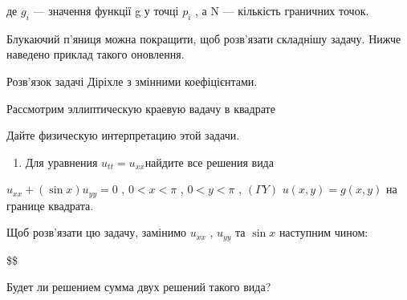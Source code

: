 \documentclass[
  ukrainian,
]{article}
\providecommand{\tightlist}{%
  \setlength{\itemsep}{0pt}\setlength{\parskip}{0pt}}
\begin{document}
де \(g_i\) --- значення функції g у точці \(p_i\) , а N --- кількість
граничних точок.

Блукаючий п'яниця можна покращити, щоб розв'язати складнішу задачу.
Нижче наведено приклад такого оновлення.

Розв'язок задачі Діріхле з змінними коефіцієнтами.

Рассмотрим эллиптическую краевую вадачу в квадрате

Дайте физическую интерпретацию этой задачи.

\begin{enumerate}
\def\labelenumi{\arabic{enumi}.}
\setcounter{enumi}{3}
\tightlist
\item
  Для уравнения \(u_{tt} = u_{xx}\)найдите все решения вида
\end{enumerate}

\(u_{xx} + (\sin x) u_{yy} = 0\) , \(0 < x < \pi\) , \(0 < y < \pi\) ,
\((\Gamma Y)\) \(u(x, y) = g(x, y)\) на границе квадрата.

Щоб розв'язати цю задачу, замінимо \(u_{xx}\) , \(u_{yy}\) та \(\sin x\)
наступним чином:

\$\$

Будет ли решением сумма двух решений такого вида?
\end{document}
